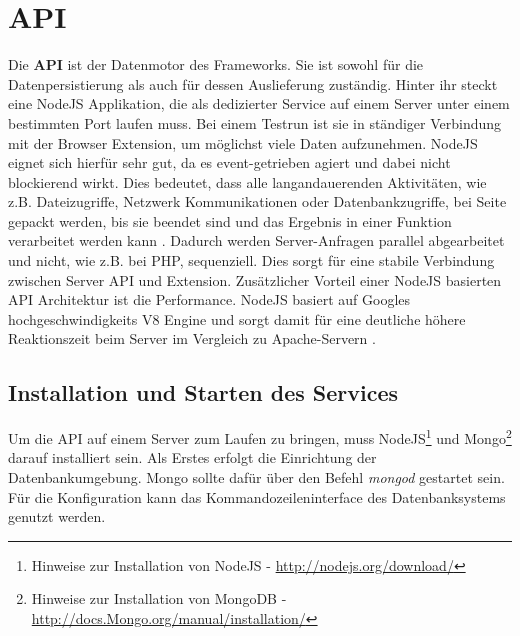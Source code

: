 %
%
%
%


\section{API}

Die \textbf{API} ist der Datenmotor des Frameworks. Sie ist sowohl für die Datenpersistierung als auch für dessen Auslieferung zuständig. Hinter ihr steckt eine NodeJS Applikation, die als dedizierter Service auf einem Server unter einem bestimmten Port laufen muss. Bei einem Testrun ist sie in ständiger Verbindung mit der Browser Extension, um möglichst viele Daten aufzunehmen. NodeJS eignet sich hierfür sehr gut, da es event-getrieben agiert und dabei nicht blockierend wirkt. Dies bedeutet, dass alle langandauerenden Aktivitäten, wie z.B. Dateizugriffe, Netzwerk Kommunikationen oder Datenbankzugriffe, bei Seite gepackt werden, bis sie beendet sind und das Ergebnis in einer Funktion verarbeitet werden kann \cite{nonblocking}. Dadurch werden Server-Anfragen parallel abgearbeitet und nicht, wie z.B. bei PHP, sequenziell. Dies sorgt für eine stabile Verbindung zwischen Server API und Extension. Zusätzlicher Vorteil einer NodeJS basierten API Architektur ist die Performance. NodeJS basiert auf Googles hochgeschwindigkeits V8 Engine und sorgt damit für eine deutliche höhere Reaktionszeit beim Server im Vergleich zu Apache-Servern \cite{nodevsphp}.

\subsection{Installation und Starten des Services}

Um die API auf einem Server zum Laufen zu bringen, muss NodeJS\footnote{Hinweise zur Installation von NodeJS - \url{http://nodejs.org/download/}} und Mongo\footnote{Hinweise zur Installation von MongoDB - \url{http://docs.Mongo.org/manual/installation/}} darauf installiert sein. Als Erstes erfolgt die Einrichtung der Datenbankumgebung. Mongo sollte dafür über den Befehl \textit{mongod} gestartet sein. Für die Konfiguration kann das Kommandozeileninterface des Datenbanksystems genutzt werden.

